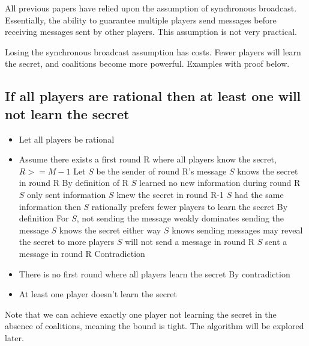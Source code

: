 \documentclass{article}
\begin{document}
All previous papers have relied upon the assumption of synchronous broadcast. Essentially, the ability to guarantee multiple players send messages before receiving messages sent by other players. This assumption is not very practical.

Losing the synchronous broadcast assumption has costs. Fewer players will learn the secret, and coalitions become more powerful. Examples with proof below.

\subsection{If all players are rational then at least one will not learn the secret}
\begin{itemize}
  \item Let all players be rational
  \item Assume there exists a first round R where all players know the secret, $R >= M-1$
  \subitem Let $S$ be the sender of round R's message
  \subitem $S$ knows the secret in round R
  \subsubitem By definition of R
  \subitem $S$ learned no new information during round R
  \subsubitem $S$ only sent information
  \subitem $S$ knew the secret in round R-1
  \subsubitem $S$ had the same information then
  \subitem $S$ rationally prefers fewer players to learn the secret 
  \subsubitem By definition
  \subitem For $S$, not sending the message weakly dominates sending the message
  \subsubitem $S$ knows the secret either way
  \subsubitem $S$ knows sending messages may reveal the secret to more players
  \subitem $S$ will not send a message in round R
  \subitem $S$ sent a message in round R
  \subitem Contradiction
  \item There is no first round where all players learn the secret
  \subitem By contradiction
  \item At least one player doesn't learn the secret
\end{itemize}

Note that we can achieve exactly one player not learning the secret in the absence of coalitions, meaning the bound is tight. The algorithm will be explored later.
\end{document}
